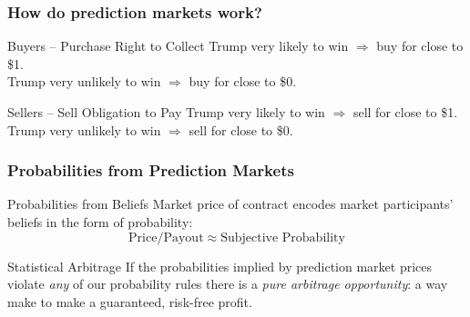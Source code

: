 \documentclass{beamer}
\begin{document}
\begin{frame}

\frametitle{How do prediction markets work?}
\begin{center}
\vspace{1em}

\begin{block}{Buyers -- Purchase Right to Collect}
Trump very likely to win $\Rightarrow$ buy for close to \$1. \\Trump very unlikely to win $\Rightarrow$ buy for close to \$0.
\end{block}

\begin{block}{Sellers -- Sell Obligation to Pay} 
Trump very likely to win $\Rightarrow$ sell for close to \$1. \\Trump very unlikely to win $\Rightarrow$ sell for close to \$0.
\end{block}
\end{center}

\end{frame}
\begin{frame}
\frametitle{Probabilities from Prediction Markets}

  \begin{block}{Probabilities from Beliefs}
    Market price of contract encodes market participants' beliefs in the form of probability:
$$\mbox{Price}/\mbox{Payout}\approx \mbox{Subjective Probability}$$
  \end{block} \pause

	\begin{alertblock}{Statistical Arbitrage}
    If the probabilities implied by prediction market prices violate \emph{any} of our probability rules there is a \emph{pure arbitrage opportunity}: a way make to make a guaranteed, risk-free profit.
	\end{alertblock}

\end{frame}
\end{document}
